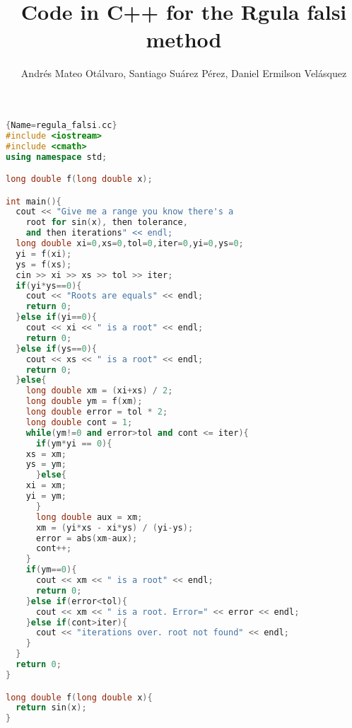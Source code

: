 \documentclass{article}
\author{Andrés Mateo Otálvaro, Santiago Suárez Pérez, Daniel Ermilson Velásquez}
\title{Code in C++ for the Rgula falsi method}
\begin{document}
\maketitle
\begin{lstlisting}[language=C++, caption=Regula Falsi method in C++]{Name=regula_falsi.cc}
#include <iostream>
#include <cmath>
using namespace std;

long double f(long double x);

int main(){
  cout << "Give me a range you know there's a 
    root for sin(x), then tolerance, 
    and then iterations" << endl;
  long double xi=0,xs=0,tol=0,iter=0,yi=0,ys=0;
  yi = f(xi);
  ys = f(xs);
  cin >> xi >> xs >> tol >> iter;
  if(yi*ys==0){
    cout << "Roots are equals" << endl;
    return 0;
  }else if(yi==0){
    cout << xi << " is a root" << endl;
    return 0;
  }else if(ys==0){
    cout << xs << " is a root" << endl;
    return 0;
  }else{
    long double xm = (xi+xs) / 2;
    long double ym = f(xm);
    long double error = tol * 2;
    long double cont = 1;
    while(ym!=0 and error>tol and cont <= iter){
      if(ym*yi == 0){
	xs = xm;
	ys = ym;
      }else{
	xi = xm;
	yi = ym;
      }
      long double aux = xm;
      xm = (yi*xs - xi*ys) / (yi-ys);
      error = abs(xm-aux);
      cont++;
    }
    if(ym==0){
      cout << xm << " is a root" << endl;
      return 0;
    }else if(error<tol){
      cout << xm << " is a root. Error=" << error << endl;
    }else if(cont>iter){
      cout << "iterations over. root not found" << endl;
    }
  }
  return 0;
}

long double f(long double x){
  return sin(x);
}

\end{lstlisting}
\end{document}
